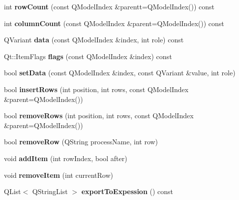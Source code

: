 \begin{DoxyCompactItemize}
\item 
\mbox{\label{class_reaction_table_model_a3519a7d8467bbbfe57e179b6fb40aea7}} 
int {\bfseries row\+Count} (const Q\+Model\+Index \&parentt=Q\+Model\+Index()) const
\item 
\mbox{\label{class_reaction_table_model_aa9535a90b7360edd2375bd66909e84d3}} 
int {\bfseries column\+Count} (const Q\+Model\+Index \&parent=Q\+Model\+Index()) const
\item 
\mbox{\label{class_reaction_table_model_a914f5bbaed263184864e321bd9bce1ed}} 
Q\+Variant {\bfseries data} (const Q\+Model\+Index \&index, int role) const
\item 
\mbox{\label{class_reaction_table_model_a76c5b3c48f7021a66205c654b643792d}} 
Qt\+::\+Item\+Flags {\bfseries flags} (const Q\+Model\+Index \&index) const
\item 
\mbox{\label{class_reaction_table_model_ab6d1ff64ff0410449dcf19454ffa2adb}} 
bool {\bfseries set\+Data} (const Q\+Model\+Index \&index, const Q\+Variant \&value, int role)
\item 
\mbox{\label{class_reaction_table_model_a7ac445b758081f1d51e32423cf33d161}} 
bool {\bfseries insert\+Rows} (int position, int rows, const Q\+Model\+Index \&parent=Q\+Model\+Index())
\item 
\mbox{\label{class_reaction_table_model_a084dce8001b85e1a548b742e42fd56b2}} 
bool {\bfseries remove\+Rows} (int position, int rows, const Q\+Model\+Index \&parent=Q\+Model\+Index())
\item 
\mbox{\label{class_reaction_table_model_a291902fa1a4e7c859eacbc76c91ae679}} 
bool {\bfseries remove\+Row} (Q\+String process\+Name, int row)
\item 
\mbox{\label{class_reaction_table_model_a205efa32146d8a7f8406a983f21446e2}} 
void {\bfseries add\+Item} (int row\+Index, bool after)
\item 
\mbox{\label{class_reaction_table_model_a4e3cf39a764c25fdc1c5c905fd615fdb}} 
void {\bfseries remove\+Item} (int current\+Row)
\item 
\mbox{\label{class_reaction_table_model_a0ba5c064f5b8da56a0f267be05f7afc9}} 
Q\+List$<$ Q\+String\+List $>$ {\bfseries export\+To\+Expession} () const
\end{DoxyCompactItemize}
